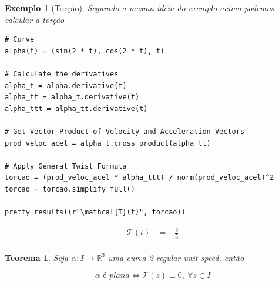 \documentclass[12pt]{article}
\newtheorem{ex}{Exemplo}[section]
\newtheorem{theorem}{Teorema}
\begin{document}
\begin{ex}[Torção]
Seguindo a mesma ideia do exemplo acima podemos calcular a torção

\begin{lstlisting}
# Curve
alpha(t) = (sin(2 * t), cos(2 * t), t)

# Calculate the derivatives
alpha_t = alpha.derivative(t)
alpha_tt = alpha_t.derivative(t)
alpha_ttt = alpha_tt.derivative(t)
    
# Get Vector Product of Velocity and Acceleration Vectors
prod_veloc_acel = alpha_t.cross_product(alpha_tt)
    
# Apply General Twist Formula
torcao = (prod_veloc_acel * alpha_ttt) / norm(prod_veloc_acel)^2
torcao = torcao.simplify_full()

pretty_results((r"\mathcal{T}(t)", torcao))
\end{lstlisting}

\newcommand{\Bold}[1]{\mathbf{#1}}\begin{align*} \mathcal{T}(t) &= -\frac{2}{5} \\ \end{align*}
\end{ex}

\begin{theorem}
Seja $\alpha: I \rightarrow \mathbb{R}^3$ uma curva 2-regular \textit{unit-speed}, então

$$\alpha \textit{ é plana} \Longleftrightarrow \mathcal{T}(s) \equiv 0,\ \forall s \in I$$
\end{theorem}



\end{document}
